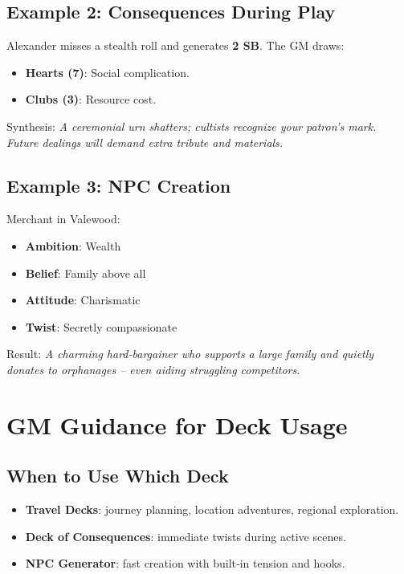 \subsection{Example 2: Consequences During Play}\label{subsec:example_consequences}
Alexander misses a stealth roll and generates \textbf{2 SB}. The GM draws:
\begin{itemize}
    \item \textbf{Hearts (7)}: Social complication.
    \item \textbf{Clubs (3)}: Resource cost.
\end{itemize}
Synthesis: \emph{A ceremonial urn shatters; cultists recognize your patron's mark. Future dealings will demand extra tribute and materials.}

\subsection{Example 3: NPC Creation}\label{subsec:example_npc}
Merchant in Valewood:
\begin{itemize}
    \item \textbf{Ambition}: Wealth
    \item \textbf{Belief}: Family above all
    \item \textbf{Attitude}: Charismatic
    \item \textbf{Twist}: Secretly compassionate
\end{itemize}
Result: \emph{A charming hard‑bargainer who supports a large family and quietly donates to orphanages -- even aiding struggling competitors.}

\section{GM Guidance for Deck Usage}\label{sec:deck_guidance}

\subsection{When to Use Which Deck}\label{subsec:deck_selection}
\begin{itemize}
    \item \textbf{Travel Decks}: journey planning, location adventures, regional exploration.
    \item \textbf{Deck of Consequences}: immediate twists during active scenes.
    \item \textbf{NPC Generator}: fast creation with built‑in tension and hooks.
\end{itemize}

